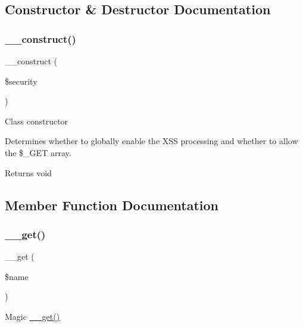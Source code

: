 \subsection{Constructor \& Destructor Documentation}
\mbox{\label{class_c_i___input_af22022547aa95d3936073a088229ad97}} 
\subsubsection{\texorpdfstring{\+\_\+\+\_\+construct()}{\_\_construct()}}
{\footnotesize\ttfamily \+\_\+\+\_\+construct (\begin{DoxyParamCaption}\item[{\mbox{\hyperlink{class_c_i___security}{C\+I\+\_\+\+Security}} \&}]{\$security }\end{DoxyParamCaption})}

Class constructor

Determines whether to globally enable the X\+SS processing and whether to allow the \$\+\_\+\+G\+ET array.

\begin{DoxyReturn}{Returns}
void 
\end{DoxyReturn}


\subsection{Member Function Documentation}
\mbox{\label{class_c_i___input_abc8e9e31bb15c8a44c3210ec551407c8}} 
\subsubsection{\texorpdfstring{\+\_\+\+\_\+get()}{\_\_get()}}
{\footnotesize\ttfamily \+\_\+\+\_\+get (\begin{DoxyParamCaption}\item[{}]{\$name }\end{DoxyParamCaption})}

Magic \mbox{\hyperlink{class_c_i___input_abc8e9e31bb15c8a44c3210ec551407c8}{\+\_\+\+\_\+get()}}

